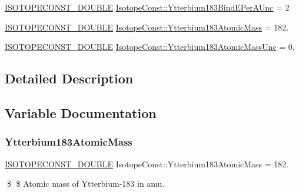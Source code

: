 \begin{DoxyCompactItemize}
\mbox{\hyperlink{group___isotope_const-_macros_ga8f45a7272ce02c0b4c65c44636ed719a}{I\+S\+O\+T\+O\+P\+E\+C\+O\+N\+S\+T\+\_\+\+D\+O\+U\+B\+LE}} \mbox{\hyperlink{group___isotope_const-_ytterbium-_yb183_gab97a0e298435ef2ab23cb442ef2ff9bc}{Isotope\+Const\+::\+Ytterbium183\+Bind\+E\+Per\+A\+Unc}} = 2
\item 
\mbox{\hyperlink{group___isotope_const-_macros_ga8f45a7272ce02c0b4c65c44636ed719a}{I\+S\+O\+T\+O\+P\+E\+C\+O\+N\+S\+T\+\_\+\+D\+O\+U\+B\+LE}} \mbox{\hyperlink{group___isotope_const-_ytterbium-_yb183_ga477b778a99c6f4d6ee0621085645ad5d}{Isotope\+Const\+::\+Ytterbium183\+Atomic\+Mass}} = 182.
\item 
\mbox{\hyperlink{group___isotope_const-_macros_ga8f45a7272ce02c0b4c65c44636ed719a}{I\+S\+O\+T\+O\+P\+E\+C\+O\+N\+S\+T\+\_\+\+D\+O\+U\+B\+LE}} \mbox{\hyperlink{group___isotope_const-_ytterbium-_yb183_gac11b5cf42a9bd39b87487b27d30d4d2f}{Isotope\+Const\+::\+Ytterbium183\+Atomic\+Mass\+Unc}} = 0.
\end{DoxyCompactItemize}


\subsection{Detailed Description}


\subsection{Variable Documentation}
\mbox{\label{group___isotope_const-_ytterbium-_yb183_ga477b778a99c6f4d6ee0621085645ad5d}} 
\subsubsection{\texorpdfstring{Ytterbium183\+Atomic\+Mass}{Ytterbium183AtomicMass}}
{\footnotesize\ttfamily \mbox{\hyperlink{group___isotope_const-_macros_ga8f45a7272ce02c0b4c65c44636ed719a}{I\+S\+O\+T\+O\+P\+E\+C\+O\+N\+S\+T\+\_\+\+D\+O\+U\+B\+LE}} Isotope\+Const\+::\+Ytterbium183\+Atomic\+Mass = 182.}

\$ \$ Atomic mass of Ytterbium-\/183 in amu. \mbox{\label{group___isotope_const-_ytterbium-_yb183_gac11b5cf42a9bd39b87487b27d30d4d2f}} 
